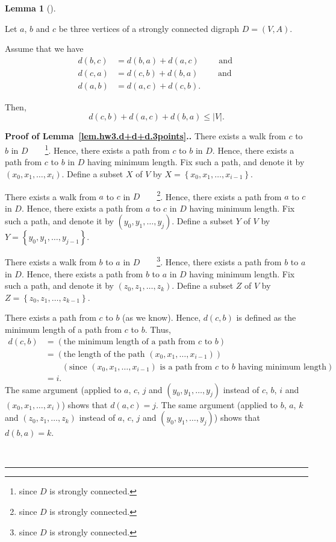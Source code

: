 \documentclass[numbers=enddot,12pt,final,onecolumn,notitlepage]{scrartcl}%
\theoremstyle{definition}
\newtheorem{lem}[theo]{Lemma}
\newenvironment{lemma}[1][]
{\begin{lem}[#1]\begin{leftbar}}
{\end{leftbar}\end{lem}}
\newenvironment{proof}[1][Proof]{\noindent\textbf{#1.} }{\ \rule{0.5em}{0.5em}}
\newcommand{\set}[1]{\left\{ #1 \right\}}
\newcommand{\abs}[1]{\left| #1 \right|}
\newcommand{\tup}[1]{\left( #1 \right)}
\begin{document}
\begin{lemma} \label{lem.hw3.d+d+d.3points}
Let $a$, $b$ and $c$ be three vertices of a strongly connected
digraph $D = \tup{V, A}$.

Assume that we have
\begin{align*}
d \tup{b, c} &= d \tup{b, a} + d \tup{a, c} \qquad \text{ and } \\
d \tup{c, a} &= d \tup{c, b} + d \tup{b, a} \qquad \text{ and } \\
d \tup{a, b} &= d \tup{a, c} + d \tup{c, b} .
\end{align*}

Then,
\[
d \tup{c, b} + d \tup{a, c} + d \tup{b, a} \leq \abs{V} .
\]
\end{lemma}

\begin{proof}[Proof of Lemma~\ref{lem.hw3.d+d+d.3points}.]
There exists a walk from $c$ to $b$ in $D$\ \ \ \ \footnote{since $D$
is strongly connected.}.
Hence, there exists a path from $c$ to $b$ in $D$.
Hence, there exists a path from $c$ to $b$ in $D$ having minimum
length.
Fix such a path, and denote it by $\tup{x_0, x_1, \ldots, x_i}$.
Define a subset $X$ of $V$ by $X = \set{x_0, x_1, \ldots, x_{i-1}}$.

There exists a walk from $a$ to $c$ in $D$\ \ \ \ \footnote{since $D$
is strongly connected.}.
Hence, there exists a path from $a$ to $c$ in $D$.
Hence, there exists a path from $a$ to $c$ in $D$ having minimum
length.
Fix such a path, and denote it by $\tup{y_0, y_1, \ldots, y_j}$.
Define a subset $Y$ of $V$ by $Y = \set{y_0, y_1, \ldots, y_{j-1}}$.

There exists a walk from $b$ to $a$ in $D$\ \ \ \ \footnote{since $D$
is strongly connected.}.
Hence, there exists a path from $b$ to $a$ in $D$.
Hence, there exists a path from $b$ to $a$ in $D$ having minimum
length.
Fix such a path, and denote it by $\tup{z_0, z_1, \ldots, z_k}$.
Define a subset $Z$ of $V$ by $Z = \set{z_0, z_1, \ldots, z_{k-1}}$.

There exists a path from $c$ to $b$ (as we know).
Hence, $d \tup{c, b}$ is defined as the minimum length of a path from
$c$ to $b$.
Thus,
\begin{align*}
d \tup{c, b}
&= \tup{\text{the minimum length of a path from } c \text{ to } b } \\
&= \tup{\text{the length of the path } \tup{x_0, x_1, \ldots, x_{i-1}}
       } \\
&\qquad \left(\text{since } \tup{x_0, x_1, \ldots, x_{i-1}}
                \text{ is a path from } c \text{ to } b
                \text{ having minimum length}\right) \\
&= i .
\end{align*}
The same argument (applied to $a$, $c$, $j$ and
$\tup{y_0, y_1, \ldots, y_j}$ instead of $c$, $b$, $i$ and
$\tup{x_0, x_1, \ldots, x_i}$) shows that $d \tup{a, c} = j$.
The same argument (applied to $b$, $a$, $k$ and
$\tup{z_0, z_1, \ldots, z_k}$ instead of $a$, $c$, $j$ and
$\tup{y_0, y_1, \ldots, y_j}$) shows that $d \tup{b, a} = k$.


\end{proof}
\end{document}
